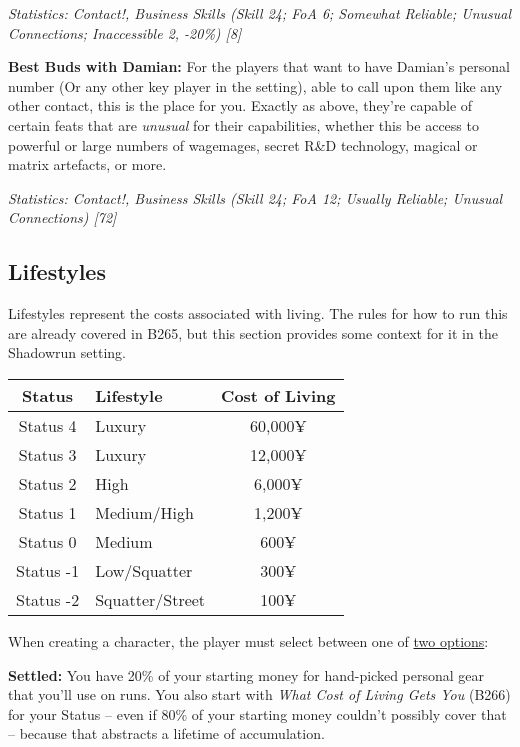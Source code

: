 \begin{multicols}{2}
	\textit{\textcolor{OliveGreen}{Statistics: Contact!, Business Skills (Skill 24; FoA 6; Somewhat Reliable; Unusual Connections; Inaccessible 2, -20\%) [8]}}
	
	\textbf{Best Buds with Damian:} For the players that want to have Damian's personal number (Or any other key player in the setting), able to call upon them like any other contact, this is the place for you. Exactly as above, they're capable of certain feats that are \textit{unusual} for their capabilities, whether this be access to powerful or large numbers of wagemages, secret R\&D technology, magical or matrix artefacts, or more.
	
	\textit{\textcolor{OliveGreen}{Statistics: Contact!, Business Skills (Skill 24; FoA 12; Usually Reliable; Unusual Connections) [72]}}
	
	\subsection{Lifestyles}
	
	Lifestyles represent the costs associated with living. The rules for how to run this are already covered in \GURPS B265, but this section provides some context for it in the Shadowrun setting.
	
	\begin{center}
		\begin{tabularx}{0.49\textwidth}{|c|X|c|}
			\hline
			Status & Lifestyle & Cost of Living \\
			\hline
			\hline
			Status 4 & Luxury & 60,000¥ \\
			Status 3 & Luxury & 12,000¥ \\
			Status 2 & High & 6,000¥ \\
			Status 1 & Medium/High & 1,200¥ \\
			Status 0 & Medium & 600¥ \\
			Status -1 & Low/Squatter & 300¥ \\
			Status -2 & Squatter/Street & 100¥ \\
			\hline
		\end{tabularx}
	\end{center}
	
	When creating a character, the player must select between one of \textcolor{Blue}{\href{http://forums.sjgames.com/showpost.php?p=1792209&postcount=7}{two options}}:
	
	\textbf{Settled:} You have 20\% of your starting money for hand-picked personal gear that you'll use on runs. You also start with \textit{What Cost of Living Gets You} (B266) for your Status – even if 80\% of your starting money couldn't possibly cover that – because that abstracts a lifetime of accumulation.
	

\end{multicols}

